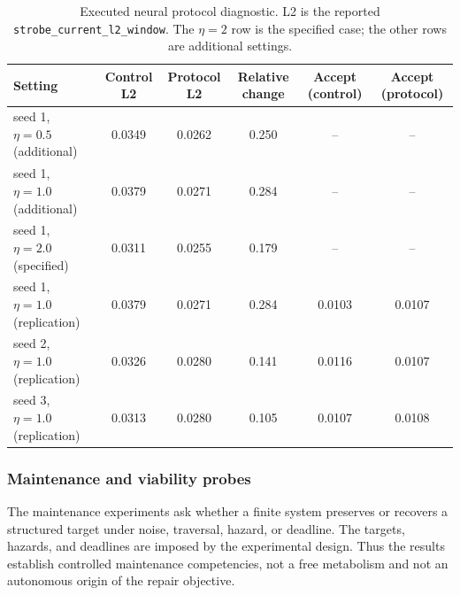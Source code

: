 \begin{table}[htbp]
\centering
\scriptsize
\begin{tabular}{@{}lccccc@{}}
\toprule
Setting & Control L2 & Protocol L2 & Relative change & Accept (control) &
Accept (protocol) \\
\midrule
seed 1, $\eta=0.5$ (additional) & 0.0349 & 0.0262 & 0.250 & -- & -- \\
seed 1, $\eta=1.0$ (additional) & 0.0379 & 0.0271 & 0.284 & -- & -- \\
seed 1, $\eta=2.0$ (specified) & 0.0311 & 0.0255 & 0.179 & -- & -- \\
\addlinespace
seed 1, $\eta=1.0$ (replication) & 0.0379 & 0.0271 & 0.284 & 0.0103 & 0.0107 \\
seed 2, $\eta=1.0$ (replication) & 0.0326 & 0.0280 & 0.141 & 0.0116 & 0.0107 \\
seed 3, $\eta=1.0$ (replication) & 0.0313 & 0.0280 & 0.105 & 0.0107 & 0.0108 \\
\bottomrule
\end{tabular}
\caption{Executed neural protocol diagnostic.  L2 is the reported
\texttt{strobe\_current\_l2\_window}.  The $\eta=2$ row is the specified
case; the other rows are additional settings.}
\label{tab:life-protocol}
\end{table}

\subsubsection{Maintenance and viability probes}

The maintenance experiments ask whether a finite system preserves or
recovers a structured target under noise, traversal, hazard, or deadline.
The targets, hazards, and deadlines are imposed by the experimental design.  Thus
the results establish controlled maintenance competencies, not a free
metabolism and not an autonomous origin of the repair objective.

